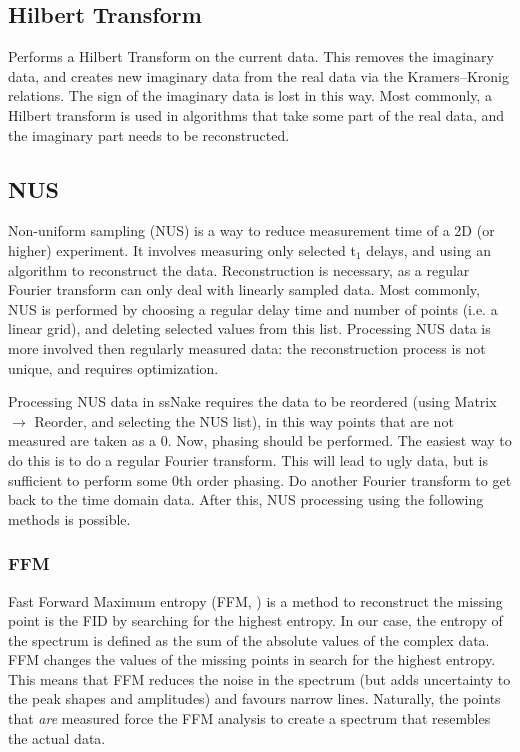 \documentclass[11pt,a4paper]{article}
\begin{document}
\subsection{Hilbert Transform}
Performs a Hilbert Transform on the current data. This removes the imaginary data, and creates new imaginary data from the real data
via the Kramers--Kronig relations. The sign of the imaginary data is lost in this way. Most commonly, a Hilbert transform is
used in algorithms that take some part of the real data, and the imaginary part needs to be reconstructed.


\subsection{NUS}
Non-uniform sampling (NUS) is a way to reduce measurement time of a 2D (or higher) experiment. It involves measuring only selected t$_1$ delays, and using
an algorithm to reconstruct the data. Reconstruction is necessary, as a regular Fourier transform can only deal with linearly sampled data.
Most commonly, NUS is performed by choosing a regular delay time and number of points (i.e. a linear grid), and deleting selected values from this list.
Processing NUS data is more involved then regularly measured data: the reconstruction process is not unique, and requires optimization.

Processing NUS data in ssNake requires the data to be reordered (using Matrix $\rightarrow$ Reorder, and selecting the NUS list), in this way
points that are not measured are taken as a 0. Now, phasing should be performed. The easiest way to do this is to do a regular Fourier transform. This will lead to ugly data, but 
is sufficient to perform some 0th order phasing. Do another Fourier transform to get back to the time domain data. After this, NUS processing using the following methods is possible.

\subsubsection{FFM}
Fast Forward Maximum entropy (FFM, \cite{balsgart2012fast}) is a method to reconstruct the missing point is the FID by searching for the highest entropy. In our case, the entropy of the spectrum is defined 
as the sum of the absolute values of the complex data. FFM changes the values of the missing points in search for the highest entropy. This means that FFM reduces
the noise in the spectrum (but adds uncertainty to the peak shapes and amplitudes) and favours narrow lines. Naturally, the points that \textit{are} measured force the FFM analysis to 
create a spectrum that resembles the actual data.
\end{document}
